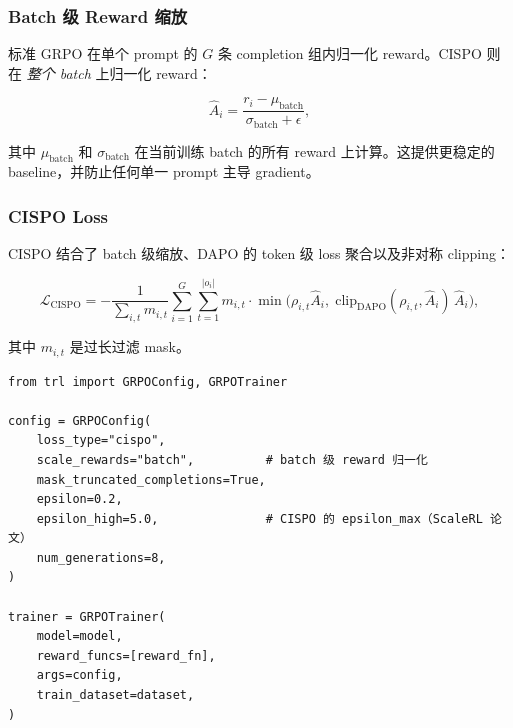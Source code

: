 \subsubsection*{Batch 级 Reward 缩放}
\label{batch-level-reward-scaling}

标准 GRPO 在单个 prompt 的 $G$ 条 completion 组内归一化 reward。CISPO 则在 \emph{整个 batch} 上归一化 reward：

\[
\hat{A}_i = \frac{r_i - \mu_{\text{batch}}}{\sigma_{\text{batch}} + \epsilon},
\]

其中 $\mu_{\text{batch}}$ 和 $\sigma_{\text{batch}}$ 在当前训练 batch 的所有 reward 上计算。这提供更稳定的 baseline，并防止任何单一 prompt 主导 gradient。

\subsubsection*{CISPO Loss}
\label{cispo-loss}

CISPO 结合了 batch 级缩放、DAPO 的 token 级 loss 聚合以及非对称 clipping：

\[
\mathcal{L}_{\text{CISPO}} =
    -\frac{1}{\sum_{i,t} m_{i,t}}
    \sum_{i=1}^G \sum_{t=1}^{|o_i|} m_{i,t} \cdot
    \min\!\bigl(\rho_{i,t}\hat{A}_i,\;
               \mathrm{clip}_{\text{DAPO}}(\rho_{i,t},\hat{A}_i)\,\hat{A}_i\bigr),
\]

其中 $m_{i,t}$ 是过长过滤 mask。

\begin{examplebox}
\begin{lstlisting}[style=pythonstyle]
from trl import GRPOConfig, GRPOTrainer

config = GRPOConfig(
    loss_type="cispo",
    scale_rewards="batch",          # batch 级 reward 归一化
    mask_truncated_completions=True,
    epsilon=0.2,
    epsilon_high=5.0,               # CISPO 的 epsilon_max（ScaleRL 论文）
    num_generations=8,
)

trainer = GRPOTrainer(
    model=model,
    reward_funcs=[reward_fn],
    args=config,
    train_dataset=dataset,
)
\end{lstlisting}
\end{examplebox}

